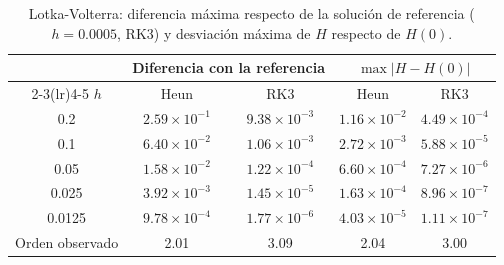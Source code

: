 \begin{table}[H]
\centering
\caption{Lotka-Volterra: diferencia máxima respecto de la solución de referencia ($h=0.0005$, RK3) y desviación máxima de $H$ respecto de $H(0)$.}
\label{tab:lotka_volterra}
\begin{tabular}{ccccc}
\toprule
 & \multicolumn{2}{c}{Diferencia con la referencia} & \multicolumn{2}{c}{$\max|H-H(0)|$} \\
\cmidrule(lr){2-3}\cmidrule(lr){4-5}
$h$ & Heun & RK3 & Heun & RK3 \\
\midrule
0.2 & $2.59\times10^{-1}$ & $9.38\times10^{-3}$ & $1.16\times10^{-2}$ & $4.49\times10^{-4}$ \\
0.1 & $6.40\times10^{-2}$ & $1.06\times10^{-3}$ & $2.72\times10^{-3}$ & $5.88\times10^{-5}$ \\
0.05 & $1.58\times10^{-2}$ & $1.22\times10^{-4}$ & $6.60\times10^{-4}$ & $7.27\times10^{-6}$ \\
0.025 & $3.92\times10^{-3}$ & $1.45\times10^{-5}$ & $1.63\times10^{-4}$ & $8.96\times10^{-7}$ \\
0.0125 & $9.78\times10^{-4}$ & $1.77\times10^{-6}$ & $4.03\times10^{-5}$ & $1.11\times10^{-7}$ \\
\midrule
Orden observado & 2.01 & 3.09 & 2.04 & 3.00 \\
\bottomrule
\end{tabular}
\end{table}
